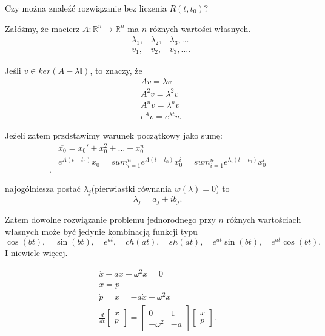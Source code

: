 \documentclass[../main.tex]{subfiles}
\begin{document}
\begin{pytanie}
    Czy można znaleźć rozwiązanie bez liczenia $R(t,t_0)?$
\end{pytanie}
\begin{obserwacja}
    Załóżmy, że macierz $A: \mathbb{R}^n\to\mathbb{R}^n$ ma $n$ różnych wartości własnych.
    \begin{align*}
        &\lambda_1,&\lambda_2, &\lambda_3,\ldots\\
        &v_1,&v_2, &v_3,\ldots
    .\end{align*}
\end{obserwacja}
\begin{obserwacja}
    Jeśli $v\in ker(A - \lambda \mathbb{I})$, to znaczy, że
    \begin{align*}
        &A v = \lambda v\\
        &A^2 v = \lambda^2 v\\
        &A^nv = \lambda^n v\\
        &e^{A}v = e^{\lambda t}v
    .\end{align*}
\end{obserwacja}
Jeżeli zatem przdstawimy warunek początkowy jako sumę:
\begin{align*}
    &\overline{x_0} = x_0' + x_0^2 + \ldots + x_0^n\\
    &e^{A(t-t_0)} \overline{x_0} = sum_{i=1}^{n}e^{A(t-t_0)}x_0^i = sum_{i=1}^n e^{\lambda_i(t-t_0)}x_0^i\\
.\end{align*}
\begin{obserwacja}
    najogólniesza postać $\lambda_j$(pierwiastki równania $w(\lambda) = 0$) to
    \[
    \lambda_j = a_j + ib_j
    .\]
\end{obserwacja}
Zatem dowolne rozwiązanie problemu jednorodnego przy $n$ różnych wartościach własnych może być jedynie kombinacją funkcji typu
\[
    \cos(bt),\quad \sin(bt),\quad e^{at},\quad ch(at),\quad sh(at),\quad e^{at}\sin(bt),\quad e^{at}\cos(bt)
.\] I niewiele więcej.

\begin{align*}
    \ddot{x} + a\dot{x} + \omega^2 x = 0\\
    \dot{x} = p\\
    \dot{p} = \ddot{x} = -a \dot{x} - \omega^2 x\\
    \frac{d}{dt}\begin{bmatrix} x\\p \end{bmatrix} = \begin{bmatrix} 0&1\\-\omega^2&-a \end{bmatrix} \begin{bmatrix} x\\p \end{bmatrix}
.\end{align*}
\end{document}
